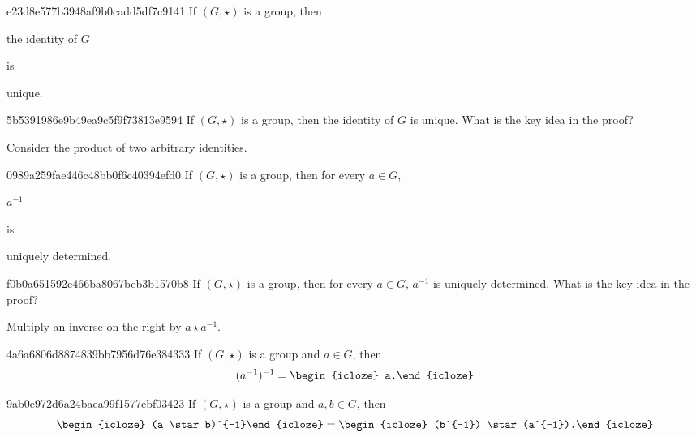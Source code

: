 \begin{note}{e23d8e577b3948af9b0cadd5df7c9141}
    If \({ (G, \star) }\) is a group, then \begin{icloze}{2}the identity of \({ G }\)\end{icloze} is \begin{icloze}{1}unique.\end{icloze}
\end{note}

\begin{note}{5b5391986e9b49ea9c5f9f73813e9594}
    If \({ (G, \star) }\) is a group, then the identity of \({ G }\) is unique.
    What is the key idea in the proof?

    \begin{cloze}{1}
        Consider the product of two arbitrary identities.
    \end{cloze}
\end{note}

\begin{note}{0989a259fae446c48bb0f6c40394efd0}
    If \({ (G, \star) }\) is a group, then for every \({ a \in G }\), \begin{icloze}{2}\({ a^{-1} }\)\end{icloze} is \begin{icloze}{1}uniquely determined.\end{icloze}
\end{note}

\begin{note}{f0b0a651592c466ba8067beb3b1570b8}
    If \({ (G, \star) }\) is a group, then for every \({ a \in G }\), \({ a^{-1} }\) is uniquely determined.
    What is the key idea in the proof?

    \begin{cloze}{1}
        Multiply an inverse on the right by \({ a \star a^{-1} }\).
    \end{cloze}
\end{note}

\begin{note}{4a6a6806d8874839bb7956d76e384333}
    If \({ (G, \star) }\) is a group and \({ a \in G }\), then
    \[
        (a^{-1})^{-1} = \begin{icloze}{1}a.\end{icloze}
    \]
\end{note}

\begin{note}{9ab0e972d6a24baea99f1577ebf03423}
    If \({ (G, \star) }\) is a group and \({ a, b \in G }\), then
    \[
        \begin{icloze}{2}(a \star b)^{-1}\end{icloze} = \begin{icloze}{1}(b^{-1}) \star (a^{-1}).\end{icloze}
    \]
\end{note}

